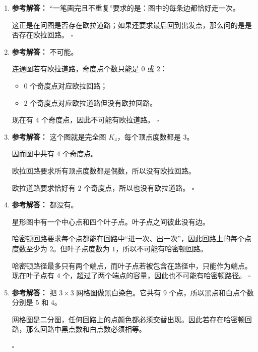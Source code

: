 \documentclass[11pt,a4paper,fontset=fandol]{ctexart}
\newenvironment{solution}{\par\noindent\textbf{参考解答：}}{\hfill$\square$\par}
\begin{document}
\begin{enumerate}
  \item \begin{solution}
  “一笔画完且不重复”要求的是：图中的每条边都恰好走一次。

  这正是在问图是否存在欧拉道路；如果还要求最后回到出发点，那么问的是是否存在欧拉回路。
  \end{solution}

  \item \begin{solution}
  不可能。

  连通图若有欧拉道路，奇度点个数只能是 $0$ 或 $2$：
  \begin{itemize}
    \item $0$ 个奇度点对应欧拉回路；
    \item $2$ 个奇度点对应欧拉道路但没有欧拉回路。
  \end{itemize}

  现在有 $4$ 个奇度点，因此不可能有欧拉道路。
  \end{solution}

  \item \begin{solution}
  这个图就是完全图 $K_4$，每个顶点度数都是 $3$。

  因而图中共有 $4$ 个奇度点。

  欧拉回路要求所有顶点度数都是偶数，所以没有欧拉回路。

  欧拉道路要求恰好有 $2$ 个奇度点，所以也没有欧拉道路。
  \end{solution}

  \item \begin{solution}
  都没有。

  星形图中有一个中心点和四个叶子点。叶子点之间彼此没有边。

  哈密顿回路要求每个点都能在回路中“进一次、出一次”，因此回路上的每个点度数至少为 $2$。但叶子点度数为 $1$，所以不可能有哈密顿回路。

  哈密顿路径最多只有两个端点，而叶子点若被包含在路径中，只能作为端点。现在叶子点有 $4$ 个，超过了两个端点的容量，因此也不可能有哈密顿路径。
  \end{solution}

  \item \begin{solution}
  把 $3\times 3$ 网格图做黑白染色。它共有 $9$ 个点，所以黑点和白点个数分别是 $5$ 和 $4$。

  网格图是二分图，任何回路上的点颜色都必须交替出现。因此若存在哈密顿回路，那么回路中黑点数和白点数必须相等。


\end{solution}
\end{enumerate}
\end{document}
